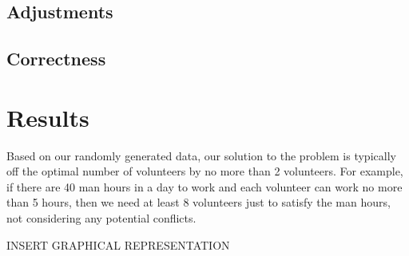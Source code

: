 \documentclass[11pt]{article}
\newif\ifcomment
\newcommand{\comment}[1]{\ifcomment#1\fi}
\theoremstyle{definition}
\begin{document}
\begin{multicols}{2}
\subsection{Adjustments}
\comment{
Our program takes the following as input from the event organizers:
\begin{itemize}
\item A list of volunteers each with their preferences and the jobs they can do.
\item A list of jobs and the shifts for the jobs.
\item The maximum number of hours a volunteer can work in a day.
\item The maximum and minimum number of hours a volunteer can work total for the event
\end{itemize}
However, in script form, we allowed these inputs to be hardcoded in as constants.
Savoy Swing Club does not have any upcoming events until September of this year so the priority is getting a good algorithm that makes favorable schedules.

Given a large pool of potential volunteers, we randomly pick sufficiently sized subsets of the volunteers and try to match them.
One would think that this probably doesn't give a very good result but it turns out, based on the very lowest possible bound of the number of volunteers required to run the event, our algorithm usually finds an schedules with a factor of 2 volunteers.

We encode the problem of volunteers having external time conflicts by pre-filling each volunteer's schedule with ``jobs'' that are labeled ``UNAVAILABLE''.
} %
\subsection{Correctness}

\section{Results}
Based on our randomly generated data, our solution to the problem is typically off the optimal number of volunteers by no more than 2 volunteers.
For example, if there are 40 man hours in a day to work and each volunteer can work no more than 5 hours, then we need at least 8 volunteers just to satisfy the man hours, not considering any potential conflicts.

INSERT GRAPHICAL REPRESENTATION


\end{multicols}
\end{document}
